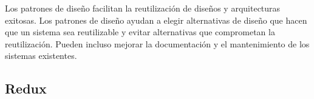 Los patrones de diseño facilitan la reutilización de diseños y arquitecturas exitosas. Los patrones de diseño ayudan a elegir alternativas de diseño que hacen que un sistema sea reutilizable y evitar alternativas que comprometan la reutilización. Pueden incluso mejorar la documentación y el mantenimiento de los sistemas existentes.

\subsection{Redux}
